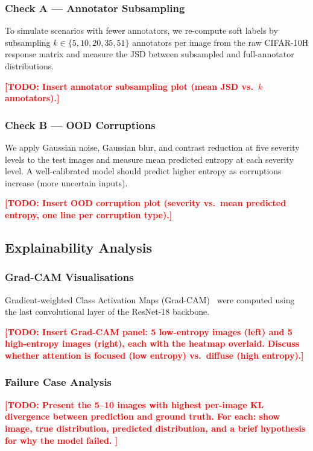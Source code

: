 \documentclass[11pt,a4paper]{article}
\newcommand{\todo}[1]{\textcolor{red}{\textbf{[TODO: #1]}}}
\begin{document}
\subsubsection{Check A — Annotator Subsampling}

To simulate scenarios with fewer annotators, we re-compute soft labels by
subsampling $k \in \{5, 10, 20, 35, 51\}$ annotators per image from the raw
CIFAR-10H response matrix and measure the JSD between subsampled and
full-annotator distributions.

\todo{Insert annotator subsampling plot (mean JSD vs.\ $k$ annotators).}

\subsubsection{Check B — OOD Corruptions}

We apply Gaussian noise, Gaussian blur, and contrast reduction at five
severity levels to the test images and measure mean predicted entropy at each
severity level.
A well-calibrated model should predict higher entropy as corruptions increase
(more uncertain inputs).

\todo{Insert OOD corruption plot (severity vs.\ mean predicted entropy, one
line per corruption type).}

\subsection{Explainability Analysis}

\subsubsection{Grad-CAM Visualisations}

Gradient-weighted Class Activation Maps (Grad-CAM)~\cite{selvaraju2017gradcam}
were computed using the last convolutional layer of the ResNet-18 backbone.

\todo{Insert Grad-CAM panel: 5 low-entropy images (left) and 5 high-entropy
images (right), each with the heatmap overlaid. Discuss whether attention is
focused (low entropy) vs.\ diffuse (high entropy).}

\subsubsection{Failure Case Analysis}

\todo{%
  Present the 5--10 images with highest per-image KL divergence between
  prediction and ground truth.
  For each: show image, true distribution, predicted distribution, and
  a brief hypothesis for why the model failed.
}
\end{document}

